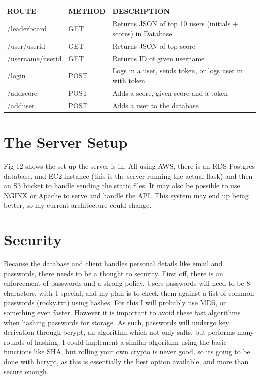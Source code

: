 \documentclass[a4paper, 11pt]{report}
\begin{document}
\begin{table}[!ht]
\begin{tabular}{|l|l|l|}
\hline
\rowcolor[HTML]{C0C0C0} 
ROUTE            & METHOD & DESCRIPTION                                                  \\ \hline
/leaderboard     & GET    & Returns JSON of top 10 users (initials + scores) in Database \\ \hline
/user/userid     & GET    & Returns JSON of top score                                    \\ \hline
/username/userid & GET    & Returns ID of given username                                 \\ \hline
/login           & POST   & Logs in a user, sends token, or logs user in with token      \\ \hline
/addscore        & POST   & Adds a score, given score and a token                        \\ \hline
/adduser         & POST   & Adds a user to the database                                  \\ \hline
\end{tabular}
\end{table}


\section{The Server Setup}
Fig 12 shows the set up the server is in. All using AWS, there is an RDS Postgres database, and EC2 instance (this is the server running the actual flask) and then an S3 bucket to handle sending the static files. It may also be possible to use NGINX or Apache to serve and handle the API. This system may end up being better, so my current architecture could change. 

\section{Security}
Because the database and client handles personal details like email and passwords, there needs to be a thought to security. First off, there is an enforcement of passwords and a strong policy. Users passwords will need to be 8 characters, with 1 special, and my plan is to check them against a list of common passwords (rocky.txt) using hashes. For this I will probably use MD5, or something even faster. However it is important to avoid these fast algorithms when hashing passwords for storage. As such, passwords will undergo key derivation through bcrypt, an algorithm which not only salts, but performs many rounds of hashing. I could implement a similar algorithm using the basic functions like SHA, but rolling your own crypto is never good, so its going to be done with bcrypt, as this is essentially the best option available, and more than secure enough.
\end{document}
